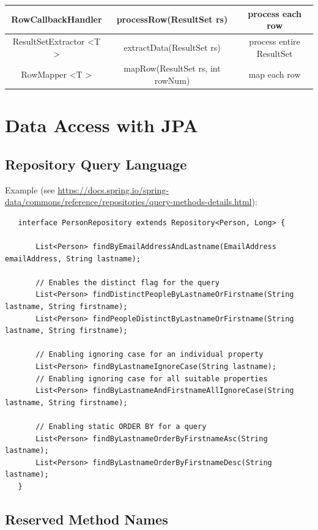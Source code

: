 \documentclass{scrartcl}
\begin{document}
\begin{tabular}{|c|c|c|}
    \hline
    RowCallbackHandler&  processRow(ResultSet rs)& process each row
    \\
    \hline
    ResultSetExtractor \textless T \textgreater& extractData(ResultSet rs)
    & process entire ResultSet\\
    \hline
    RowMapper \textless T \textgreater& mapRow(ResultSet rs, int rowNum)
    &  map each row \\
    \hline
\end{tabular}


\section{Data Access with JPA}
\subsection{Repository Query Language}

Example (see \url{  https://docs.spring.io/spring-data/commons/reference/repositories/query-methods-details.html}):


\begin{lstlisting}
   interface PersonRepository extends Repository<Person, Long> {

       List<Person> findByEmailAddressAndLastname(EmailAddress emailAddress, String lastname);

       // Enables the distinct flag for the query
       List<Person> findDistinctPeopleByLastnameOrFirstname(String lastname, String firstname);
       List<Person> findPeopleDistinctByLastnameOrFirstname(String lastname, String firstname);

       // Enabling ignoring case for an individual property
       List<Person> findByLastnameIgnoreCase(String lastname);
       // Enabling ignoring case for all suitable properties
       List<Person> findByLastnameAndFirstnameAllIgnoreCase(String lastname, String firstname);

       // Enabling static ORDER BY for a query
       List<Person> findByLastnameOrderByFirstnameAsc(String lastname);
       List<Person> findByLastnameOrderByFirstnameDesc(String lastname);
   }
\end{lstlisting}

\subsection{Reserved Method Names}
\end{document}
